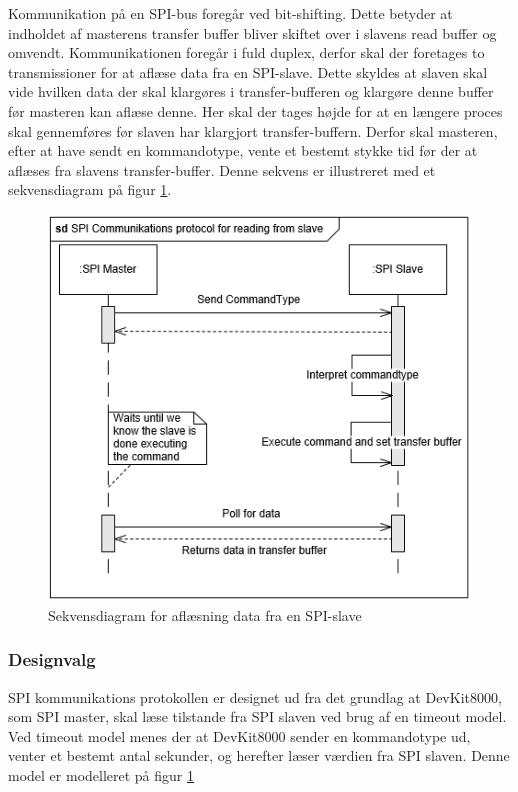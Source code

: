 Kommunikation på en SPI-bus foregår ved bit-shifting. Dette betyder at indholdet af masterens transfer buffer bliver skiftet over i slavens read buffer og omvendt. Kommunikationen foregår i fuld duplex, derfor skal der foretages to transmissioner for at aflæse data fra en SPI-slave. Dette skyldes at slaven skal vide hvilken data der skal klargøres i transfer-bufferen og klargøre denne buffer før masteren kan aflæse denne. Her skal der tages højde for at en længere proces skal gennemføres før slaven har klargjort transfer-buffern. Derfor skal masteren, efter at have sendt en kommandotype, vente et bestemt stykke tid før der at aflæses fra slavens transfer-buffer. Denne sekvens er illustreret med et sekvensdiagram på figur \ref{figure:SDSpiSlaveRead}.

\begin{figure}[H]
	\centering
	\includegraphics[]{Systemarkitektur/images/SDSpiSlaveRead}
	\caption{Sekvensdiagram for aflæsning data fra en SPI-slave}
	\label{figure:SDSpiSlaveRead}
\end{figure} 

\subsubsection{Designvalg}
SPI kommunikations protokollen er designet ud fra det grundlag at DevKit8000, som SPI master, skal læse tilstande fra SPI slaven ved brug af en timeout model. Ved timeout model menes der at DevKit8000 sender en kommandotype ud, venter et bestemt antal sekunder, og herefter læser værdien fra SPI slaven. Denne model er modelleret på figur \ref{figure:SDSpiSlaveRead}

